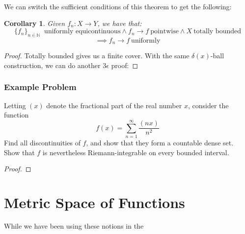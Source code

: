 \documentclass[10pt,letterpaper]{article} %
\newtheorem{cor}{Corollary}[section]
\begin{document}
We can switch the sufficient conditions of this theorem to get the following:
\begin{cor}
Given $f_n: X \xrightarrow{} Y$, we have that:
\begin{equation*}
  \{f_n\}_{n \in \mathbb{N}} \ \text{ uniformly equicontinuous} \land f_n \xrightarrow{} f \ \text{pointwise} \land X \ \text{totally bounded}
\end{equation*}
\begin{equation*}
  \implies f_n \xrightarrow{} f \ \text{uniformly}
\end{equation*}
\end{cor}
\begin{proof}
Totally bounded gives us a finite cover. With the same $\delta(x)$-ball construction, we can do another $3\epsilon$ proof:
\end{proof}

\subsubsection{Example Problem}
Letting $(x)$ denote the fractional part of the real number $x$, consider the function
\begin{equation*}
f(x) = \sum_{n=1}^{\infty}\frac{(nx)}{n^2}
\end{equation*}
Find all discontinuities of $f$, and show that they form a countable dense set. Show that $f$ is nevertheless Riemann-integrable on every bounded interval.

\begin{proof}

\end{proof}
\pagebreak
\section*{Metric Space of Functions}
While we have been using these notions in the 
\end{document}
